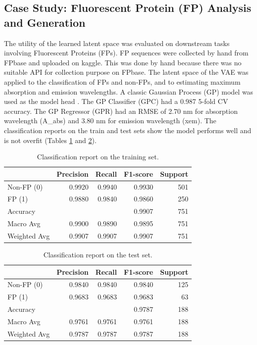 \documentclass[numsec,webpdf,contemporary,medium]{oup-authoring-template}
\begin{document}
\subsection{Case Study: Fluorescent Protein (FP) Analysis and Generation}\label{sec:fp_application}
The utility of the learned latent space was evaluated on downstream tasks involving Fluorescent Proteins (FPs). FP sequences were collected by hand from FPbase \citep{lambert2022fpbase} and uploaded on kaggle. This was done by hand because there was no suitable API for collection purpose on FPbase. The latent space of the VAE was applied to the classification of FPs and non-FPs, and to estimating maximum absorption and emission wavelengths. A classic Gaussian Process (GP) model was used as the model head \citep{rasmussen2006gaussian}. The GP Classifier (GPC) had a 0.987 5-fold CV accuracy. The GP Regressor (GPR) had an RMSE of 2.70 nm for absorption wavelength (A\_abs) and 3.80 nm for emission wavelength (xem). The classification reports on the train and test sets show the model performs well and is not overfit (Tables \ref{tab:class_report_train} and \ref{tab:class_report_test}).

\begin{table}[!ht]
\centering
\caption{Classification report on the training set.}\label{tab:class_report_train}
\begin{tabular*}{0.5\textwidth}{@{\extracolsep{\fill}}lrrrr}
\toprule
& \textbf{Precision} & \textbf{Recall} & \textbf{F1-score} & \textbf{Support} \\
\midrule
Non-FP (0) & 0.9920 & 0.9940 & 0.9930 & 501 \\
FP (1) & 0.9880 & 0.9840 & 0.9860 & 250 \\
\midrule
Accuracy & & & 0.9907 & 751 \\
Macro Avg & 0.9900 & 0.9890 & 0.9895 & 751 \\
Weighted Avg & 0.9907 & 0.9907 & 0.9907 & 751 \\
\bottomrule
\end{tabular*}
\end{table}

\begin{table}[!ht]
\centering
\caption{Classification report on the test set.}\label{tab:class_report_test}
\begin{tabular*}{0.5\textwidth}{@{\extracolsep{\fill}}lrrrr}
\toprule
& \textbf{Precision} & \textbf{Recall} & \textbf{F1-score} & \textbf{Support} \\
\midrule
Non-FP (0) & 0.9840 & 0.9840 & 0.9840 & 125 \\
FP (1) & 0.9683 & 0.9683 & 0.9683 & 63 \\
\midrule
Accuracy & & & 0.9787 & 188 \\
Macro Avg & 0.9761 & 0.9761 & 0.9761 & 188 \\
Weighted Avg & 0.9787 & 0.9787 & 0.9787 & 188 \\
\bottomrule
\end{tabular*}
\end{table}
\end{document}
